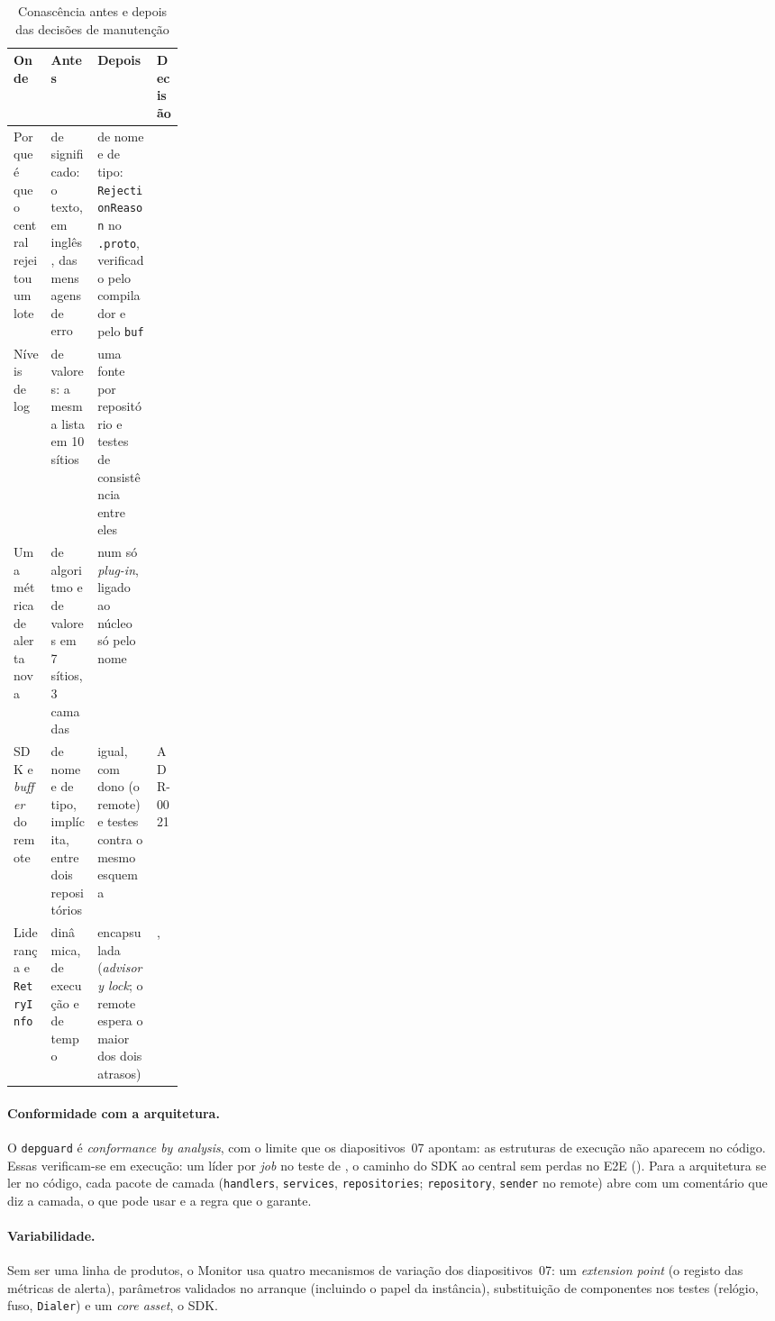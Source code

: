 \begin{table}[htbp]
  \centering\small
  \caption{Conascência antes e depois das decisões de manutenção}
  \label{tab:conascencia}
  \begin{tabularx}{\linewidth}{L{0.22\linewidth}YYl}
    \toprule
    Onde & Antes & Depois & Decisão \\
    \midrule
    Porque é que o central rejeitou um lote & de significado: o texto, em inglês, das mensagens de erro & de nome e de tipo: \texttt{RejectionReason} no \texttt{.proto}, verificado pelo compilador e pelo \texttt{buf} &  \\
    Níveis de log & de valores: a mesma lista em 10 sítios & uma fonte por repositório e testes de consistência entre eles &  \\
    Uma métrica de alerta nova & de algoritmo e de valores em 7 sítios, 3 camadas & num só \emph{plug-in}, ligado ao núcleo só pelo nome &  \\
    SDK e \emph{buffer} do remote & de nome e de tipo, implícita, entre dois repositórios & igual, com dono (o remote) e testes contra o mesmo esquema & ADR-0021 \\
    Liderança e \texttt{RetryInfo} & dinâmica, de execução e de tempo & encapsulada (\emph{advisory lock}; o remote espera o maior dos dois atrasos) & ,  \\
    \bottomrule
  \end{tabularx}
\end{table}

\paragraph{Conformidade com a arquitetura.}
O \texttt{depguard} é \emph{conformance by analysis}, com o limite que os diapositivos~07 apontam: as estruturas
de execução não aparecem no código. Essas verificam-se em execução: um líder por \emph{job} no teste de ,
o caminho do SDK ao central sem perdas no E2E (). Para a arquitetura se ler no código, cada pacote de
camada (\texttt{handlers}, \texttt{services}, \texttt{repositories}; \texttt{repository}, \texttt{sender} no
remote) abre com um comentário que diz a camada, o que pode usar e a regra que o garante.

\paragraph{Variabilidade.}
Sem ser uma linha de produtos, o Monitor usa quatro mecanismos de variação dos diapositivos~07: um
\emph{extension point} (o registo das métricas de alerta), parâmetros validados no arranque (incluindo o papel da
instância), substituição de componentes nos testes (relógio, fuso, \texttt{Dialer}) e um \emph{core asset}, o SDK.

